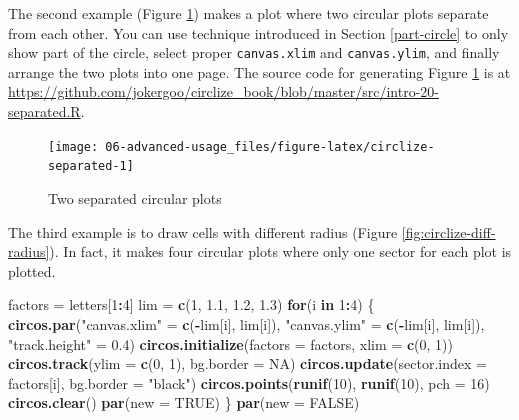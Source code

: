 \documentclass[]{book}
\newenvironment{Shaded}{\begin{snugshade}}{\end{snugshade}}
\newcommand{\KeywordTok}[1]{\textcolor[rgb]{0.13,0.29,0.53}{\textbf{#1}}}
\newcommand{\DataTypeTok}[1]{\textcolor[rgb]{0.13,0.29,0.53}{#1}}
\newcommand{\DecValTok}[1]{\textcolor[rgb]{0.00,0.00,0.81}{#1}}
\newcommand{\FloatTok}[1]{\textcolor[rgb]{0.00,0.00,0.81}{#1}}
\newcommand{\StringTok}[1]{\textcolor[rgb]{0.31,0.60,0.02}{#1}}
\newcommand{\OtherTok}[1]{\textcolor[rgb]{0.56,0.35,0.01}{#1}}
\newcommand{\ControlFlowTok}[1]{\textcolor[rgb]{0.13,0.29,0.53}{\textbf{#1}}}
\newcommand{\OperatorTok}[1]{\textcolor[rgb]{0.81,0.36,0.00}{\textbf{#1}}}
\newcommand{\NormalTok}[1]{#1}
\theoremstyle{definition}
\theoremstyle{definition}
\theoremstyle{remark}
\begin{document}
The second example (Figure \ref{fig:circlize-separated}) makes a plot
where two circular plots separate from each other. You can use technique
introduced in Section \ref{part-circle} to only show part of the circle,
select proper \texttt{canvas.xlim} and \texttt{canvas.ylim}, and finally
arrange the two plots into one page. The source code for generating
Figure \ref{fig:circlize-separated} is at
\url{https://github.com/jokergoo/circlize_book/blob/master/src/intro-20-separated.R}.

\begin{figure}

{\centering \texttt{[image: 06-advanced-usage\_files/figure-latex/circlize-separated-1]} 

}

\caption{Two separated circular plots}\label{fig:circlize-separated}
\end{figure}

The third example is to draw cells with different radius (Figure
\ref{fig:circlize-diff-radius}). In fact, it makes four circular plots
where only one sector for each plot is plotted.

\begin{Shaded}
\begin{Highlighting}[]
\NormalTok{factors =}\StringTok{ }\NormalTok{letters[}\DecValTok{1}\OperatorTok{:}\DecValTok{4}\NormalTok{]}
\NormalTok{lim =}\StringTok{ }\KeywordTok{c}\NormalTok{(}\DecValTok{1}\NormalTok{, }\FloatTok{1.1}\NormalTok{, }\FloatTok{1.2}\NormalTok{, }\FloatTok{1.3}\NormalTok{)}
\ControlFlowTok{for}\NormalTok{(i }\ControlFlowTok{in} \DecValTok{1}\OperatorTok{:}\DecValTok{4}\NormalTok{) \{}
    \KeywordTok{circos.par}\NormalTok{(}\StringTok{"canvas.xlim"}\NormalTok{ =}\StringTok{ }\KeywordTok{c}\NormalTok{(}\OperatorTok{-}\NormalTok{lim[i], lim[i]), }
        \StringTok{"canvas.ylim"}\NormalTok{ =}\StringTok{ }\KeywordTok{c}\NormalTok{(}\OperatorTok{-}\NormalTok{lim[i], lim[i]), }
        \StringTok{"track.height"}\NormalTok{ =}\StringTok{ }\FloatTok{0.4}\NormalTok{)}
    \KeywordTok{circos.initialize}\NormalTok{(}\DataTypeTok{factors =}\NormalTok{ factors, }\DataTypeTok{xlim =} \KeywordTok{c}\NormalTok{(}\DecValTok{0}\NormalTok{, }\DecValTok{1}\NormalTok{))}
    \KeywordTok{circos.track}\NormalTok{(}\DataTypeTok{ylim =} \KeywordTok{c}\NormalTok{(}\DecValTok{0}\NormalTok{, }\DecValTok{1}\NormalTok{), }\DataTypeTok{bg.border =} \OtherTok{NA}\NormalTok{)}
    \KeywordTok{circos.update}\NormalTok{(}\DataTypeTok{sector.index =}\NormalTok{ factors[i], }\DataTypeTok{bg.border =} \StringTok{"black"}\NormalTok{)}
    \KeywordTok{circos.points}\NormalTok{(}\KeywordTok{runif}\NormalTok{(}\DecValTok{10}\NormalTok{), }\KeywordTok{runif}\NormalTok{(}\DecValTok{10}\NormalTok{), }\DataTypeTok{pch =} \DecValTok{16}\NormalTok{)}
    \KeywordTok{circos.clear}\NormalTok{()}
    \KeywordTok{par}\NormalTok{(}\DataTypeTok{new =} \OtherTok{TRUE}\NormalTok{)}
\NormalTok{\}}
\KeywordTok{par}\NormalTok{(}\DataTypeTok{new =} \OtherTok{FALSE}\NormalTok{)}
\end{Highlighting}
\end{Shaded}
\end{document}

